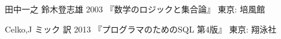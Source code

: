 \begin{thebibliography}{99}
\item
    田中一之 鈴木登志雄
    2003
    『数学のロジックと集合論』
    東京: 培風館
\item
    Celko,J
    ミック 訳
    2013
    『プログラマのためのSQL 第4版』
    東京: 翔泳社
\end{thebibliography}